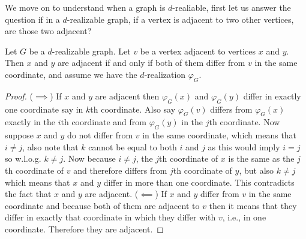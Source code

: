 \documentclass[12pt,a4paper,titlepage,openany]{report}
\begin{document}
We move on to understand when a graph is $d$-realiable, first let us answer the question if in a $d$-realizable graph, if a vertex is adjacent to two other vertices, are those two adjacent?
\begin{lemma}\label{xyv adjacent}
Let $G$ be a $d$-realizable graph. Let $v$ be a vertex adjacent to vertices $x$ and $y$. Then $x$ and $y$ are adjacent if and only if both of them differ from $v$ in the same coordinate, and assume we have the $d$-realization $\varphi_G$.
\end{lemma}
\begin{proof}
($\implies$) If $x$ and $y$ are adjacent then $\varphi_G(x)$ and $\varphi_G(y)$ differ in exactly one coordinate say in $k$th coordinate. Also say $\varphi_G(v)$ differs from $\varphi_G(x)$ exactly in the $i$th coordinate and from $\varphi_G(y)$ in the $j$th coordinate. Now suppose $x$ and $y$ do not differ from $v$ in the same coordinate, which means that $i\neq j$, also note that $k$ cannot be equal to both $i$ and $j$ as this would imply $i=j$ so w.l.o.g. $k\neq j$. Now because $i\neq j$, the $j$th coordinate of $x$ is the same as the $j$th coordinate of $v$ and therefore differs from $j$th coordinate of $y$, but also $k\neq j$ which means that $x$ and $y$ differ in more than one coordinate. This contradicts the fact that $x$ and $y$ are adjacent.\newline
($\impliedby$) If $x$ and $y$ differ from $v$ in the same coordinate and because both of them are adjacent to $v$ then it means that they differ in exactly that coordinate in which they differ with $v$, i.e., in one coordinate. Therefore they are adjacent.
\end{proof}
\end{document}
